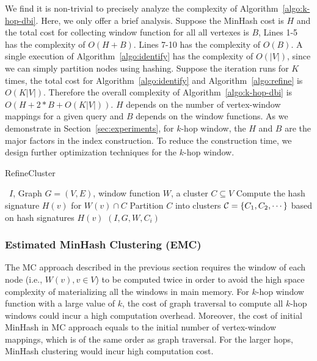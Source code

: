 We find it is non-trivial to precisely analyze the complexity of Algorithm~\ref{algo:k-hop-dbi}.
Here, we only offer a brief analysis. Suppose the MinHash cost is $H$ and 
the total cost for collecting window function for all all vertexes is $B$, 
Lines 1-5 has the complexity of $O(H + B)$.  
Lines 7-10 has the complexity of $O(B)$. A single execution of Algorithm~\ref{algo:identify}  has the  complexity of $O(|V|)$, since we can simply partition nodes using hashing. Suppose the iteration runs for $K$ times, the total cost for Algorithm~\ref{algo:identify} and Algorithm~\ref{algo:refine} is $O(K|V|)$. Therefore the overall complexity of Algorithm~\ref{algo:k-hop-dbi} is $O(H+2*B + O(K|V|))$. $H$ depends on the number of vertex-window mappings for a given query and $B$ depends on the window functions.
As we demonstrate in Section~\ref{sec:experiments}, for $k$-hop window, the $H$ and $B$ are the major factors in the index construction. To reduce the construction time, we design further optimization techniques for the $k$-hop window.


\begin{algorithm}
\caption{RefineCluster}
\begin{algorithmic}[1]
\Require \DBIndex\ $I$, Graph $G=(V,E)$, window function $W$, a cluster $C \subseteq V$
{}
	\State Compute the hash signature $H(v)$ for $W(v) \cap C$
\EndFor
\State Partition $C$ into clusters ${\cal C} = \{C_1,C_2,\cdots\}$ based on hash signatures $H(v)$
	 $(I,G,W,C_i)$
\EndFor
\end{algorithmic}
\label{algo:refine}
\end{algorithm}

\subsubsection{Estimated MinHash Clustering (EMC)}
\label{sec:optimized}

The MC approach described in the previous section requires the window of each node (i.e., $W(v), v \in V$)
to be computed twice in order to avoid the high space complexity of materializing all the windows in main memory.
For $k$-hop window function with a large value of $k$, the cost of graph traversal 
to compute all $k$-hop windows
could incur a high computation overhead. Moreover, the cost of initial MinHash in MC approach equals to the initial number of vertex-window mappings, which is of the same order as graph traversal. For the larger hops, MinHash clustering would incur high computation cost.

